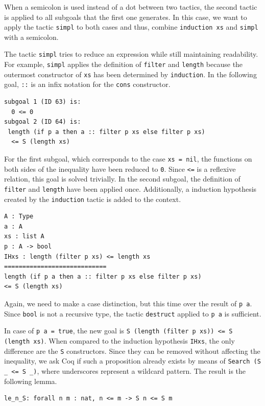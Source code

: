 \documentclass[a4paper, 11pt, fleqn, twoside, abstract=on]{scrreprt}
\newcommand{\cinl}[1]{\texttt{#1}}
\begin{document}
When a semicolon is used instead of a dot between two tactics, the second tactic is applied to all subgoals that the first one generates.
In this case, we want to apply the tactic \cinl{simpl} to both cases and thus, combine \cinl{induction xs} and \cinl{simpl} with a semicolon.

The tactic \cinl{simpl} tries to reduce an expression while still maintaining readability.
For example, \cinl{simpl} applies the definition of \cinl{filter} and \cinl{length} because the outermost constructor of \cinl{xs} has been determined by \cinl{induction}.
In the following goal, \cinl{::} is an infix notation for the \cinl{cons} constructor.

\begin{verbatim}
subgoal 1 (ID 63) is:
  0 <= 0
subgoal 2 (ID 64) is:
 length (if p a then a :: filter p xs else filter p xs) 
  <= S (length xs)
\end{verbatim}

For the first subgoal, which corresponds to the case \cinl{xs = nil}, the functions on both sides of the inequality have been reduced to \cinl{0}.
Since \cinl{<=} is a reflexive relation, this goal is solved trivially.
In the second subgoal, the definition of \cinl{filter} and \cinl{length} have been applied once.
Additionally, a induction hypothesis created by the \cinl{induction} tactic is added to the context.

\begin{verbatim}
A : Type
a : A
xs : list A
p : A -> bool
IHxs : length (filter p xs) <= length xs
============================
length (if p a then a :: filter p xs else filter p xs)
<= S (length xs)
\end{verbatim}

Again, we need to make a case distinction, but this time over the result of \cinl{p a}.
Since \cinl{bool} is not a recursive type, the tactic \cinl{destruct} applied to \cinl{p a} is sufficient.

In case of \cinl{p a = true}, the new goal is \cinl{S (length (filter p xs)) <= S (length xs)}.
When compared to the induction hypothesis \cinl{IHxs}, the only difference are the \cinl{S} constructors.
Since they can be removed without affecting the inequality, we ask Coq if such a proposition already exists by means of \cinl{Search (S _ <= S _)}, where underscores represent a wildcard pattern.
The result is the following lemma.

\begin{verbatim}
le_n_S: forall n m : nat, n <= m -> S n <= S m
\end{verbatim}
\end{document}
